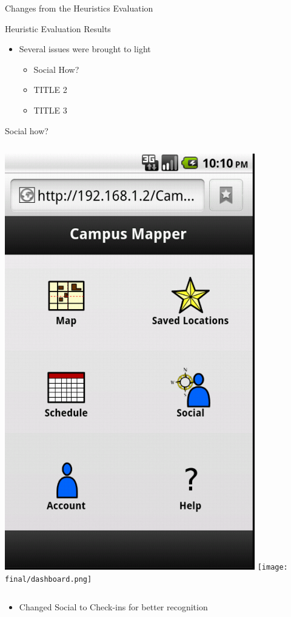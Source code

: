 \documentclass{beamer}
\begin{document}
\begin{frame}{Changes from the Heuristics Evaluation}
    \begin{block}{Heuristic Evaluation Results} 
    \begin{itemize}
        \item Several issues were brought to light
        \begin{itemize}
            \item Social How?
            \item TITLE 2
            \item TITLE 3
        \end{itemize}
    \end{itemize}
    \end{block}
\end{frame}

\begin{frame}{Social how?}
    \begin{columns}[c]
        \center\includegraphics[height=0.5 \textheight]{final-pre-h/dashboard.png}
        \center\texttt{[image: final/dashboard.png]}
    \end{columns}
    \begin{itemize}
        \item Changed Social to Check-ins for better recognition
    \end{itemize}
\end{frame}
\end{document}

